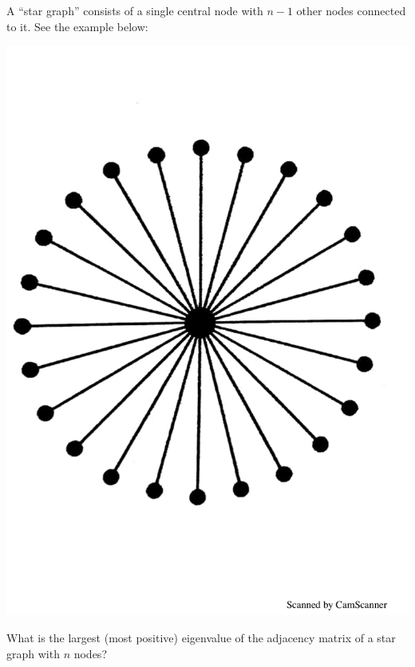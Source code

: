 \documentclass[11pt]{article}
\begin{document}
\newpage

\begin{tcolorbox}[title = 3. (Newman 6.6)]
    A ``star graph'' consists of a single central node with $n-1$ other nodes connected to it. See the example below:
    \begin{center}
        \includegraphics[scale=0.2]{./homework/figures/star.pdf}
    \end{center}
What is the largest (most positive) eigenvalue of the adjacency matrix of a star graph with $n$ nodes?
\end{tcolorbox}
\end{document}
